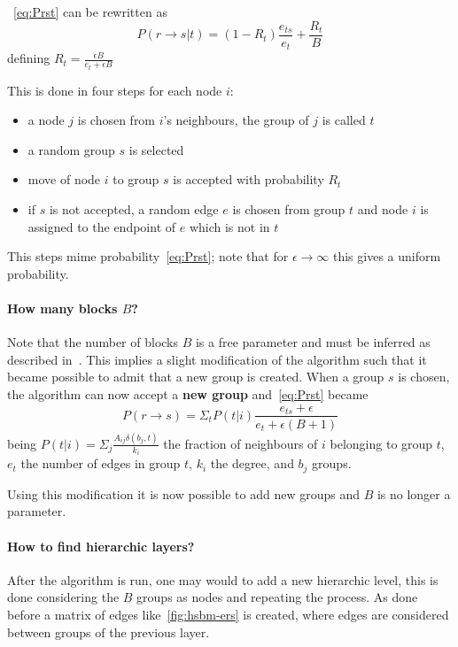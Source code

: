 ~\ref{eq:Prst} can be rewritten as \[P(r\to s|t)=(1-R_t)\frac{e_{ts}}{e_t}+\frac{R_t}{B}\]
defining $R_t=\frac{\epsilon B}{e_t + \epsilon B}$

This is done in four steps for each node $i$:
\begin{itemize}
  \item a node $j$ is chosen from $i$'s neighbours, the group of $j$ is called
  $t$
  \item a random group $s$ is selected
  \item move of node $i$ to group $s$ is accepted with probability $R_t$
  \item if $s$ is not accepted, a random edge $e$ is chosen from group $t$ and node $i$ is assigned to the endpoint of $e$ which is not in $t$
\end{itemize}
This steps mime probability~\ref{eq:Prst}; note that for $\epsilon\to\infty$ this gives a uniform probability.

\paragraph{How many blocks $B$?}
Note that the number of blocks $B$ is a free parameter and must be inferred as described in~\cite{peixoto2017nonparametric}.
This implies a slight modification of the algorithm such that
it became possible to admit that a new group is created.
When a group $s$ is chosen, the algorithm can now accept a \textbf{new group} and~\ref{eq:Prst} became
\begin{equation}\label{eq:PrstB1}
  P(r\to s)=\Sigma_t P(t|i)\frac{e_{ts}+\epsilon}{e_t+\epsilon (B+1)}
\end{equation}
being $P(t|i)=\Sigma_j\frac{A_{ij}\delta(b_j, t)}{k_i}$ the fraction of neighbours of $i$ belonging to group $t$, $e_t$ the number of edges in group $t$,
$k_i$ the degree, and $b_j$ groups.

Using this modification it is now possible to add new groups and $B$ is no longer a parameter.

\paragraph{How to find hierarchic layers?}
After the algorithm is run, one may would to add a new hierarchic level, this is done considering the $B$ groups as nodes and repeating the process.
As done before a matrix of edges like~\ref{fig:hsbm-ers} is created, where edges
are considered between groups of the previous layer.

